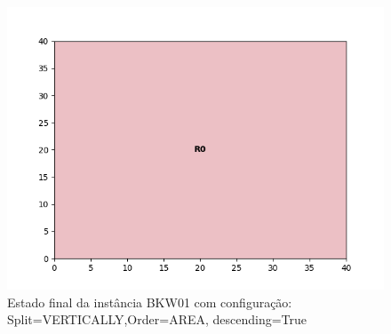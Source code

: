 \begin{figure}[H]
    \centering
    \caption[]{Estado final da instância BKW01 com configuração: Split=VERTICALLY,Order=AREA, descending=True}
    \label{fig:bkw01-vertically-area-true}
    \includegraphics[scale=0.5]{output/figures/bkw/bkw01/vertically/area/true/00}
\end{figure}